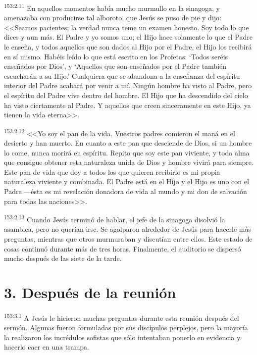 \par 
\textsuperscript{153:2.11} En aquellos momentos había mucho murmullo en la sinagoga, y amenazaba con producirse tal alboroto, que Jesús se puso de pie y dijo: <<Seamos pacientes; la verdad nunca teme un examen honesto. Soy todo lo que dices y aun más. El Padre y yo somos uno; el Hijo hace solamente lo que el Padre le enseña, y todos aquellos que son dados al Hijo por el Padre, el Hijo los recibirá en sí mismo. Habéis leído lo que está escrito en los Profetas: `Todos seréis enseñados por Dios', y `Aquellos que son enseñados por el Padre también escucharán a su Hijo.' Cualquiera que se abandona a la enseñanza del espíritu interior del Padre acabará por venir a mí. Ningún hombre ha visto al Padre, pero el espíritu del Padre vive dentro del hombre. El Hijo que ha descendido del cielo ha visto ciertamente al Padre. Y aquellos que creen sinceramente en este Hijo, ya tienen la vida eterna>>.

\par 
\textsuperscript{153:2.12} <<Yo soy el pan de la vida. Vuestros padres comieron el maná en el desierto y han muerto. En cuanto a este pan que desciende de Dios, si un hombre lo come, nunca morirá en espíritu. Repito que soy este pan viviente, y toda alma que consigue obtener esta naturaleza unida de Dios y hombre vivirá para siempre. Este pan de vida que doy a todos los que quieren recibirlo es mi propia naturaleza viviente y combinada. El Padre está en el Hijo y el Hijo es uno con el Padre ---ésta es mi revelación donadora de vida al mundo y mi don de salvación para todas las naciones>>.

\par 
\textsuperscript{153:2.13} Cuando Jesús terminó de hablar, el jefe de la sinagoga disolvió la asamblea, pero no querían irse. Se agolparon alrededor de Jesús para hacerle más preguntas, mientras que otros murmuraban y discutían entre ellos. Este estado de cosas continuó durante más de tres horas. Finalmente, el auditorio se dispersó mucho después de las siete de la tarde.

\section*{3. Después de la reunión}
\par 
\textsuperscript{153:3.1} A Jesús le hicieron muchas preguntas durante esta reunión después del sermón. Algunas fueron formuladas por sus discípulos perplejos, pero la mayoría la realizaron los incrédulos sofistas que sólo intentaban ponerlo en evidencia y hacerlo caer en una trampa.

